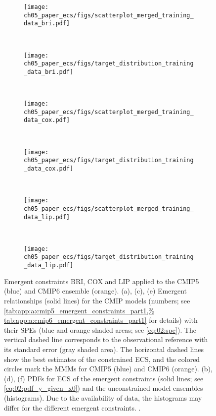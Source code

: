 \begin{figure}[p]
  \centering
  \begin{subfigure}[b]{\SmallSubfigureWidth{}}
    \texttt{[image: 
      ch05\_paper\_ecs/figs/scatterplot\_merged\_training\_data\_bri.pdf]}
    \caption{}
    \label{fig:05:bri_cox_lip:a}
  \end{subfigure}
  ~
  \begin{subfigure}[b]{\SmallSubfigureWidth{}}
    \texttt{[image: 
      ch05\_paper\_ecs/figs/target\_distribution\_training\_data\_bri.pdf]}
    \caption{}
    \label{fig:05:bri_cox_lip:b}
  \end{subfigure}
  \\
  \begin{subfigure}[b]{\SmallSubfigureWidth{}}
    \texttt{[image: 
      ch05\_paper\_ecs/figs/scatterplot\_merged\_training\_data\_cox.pdf]}
    \caption{}
    \label{fig:05:bri_cox_lip:c}
  \end{subfigure}
  ~
  \begin{subfigure}[b]{\SmallSubfigureWidth{}}
    \texttt{[image: 
      ch05\_paper\_ecs/figs/target\_distribution\_training\_data\_cox.pdf]}
    \caption{}
    \label{fig:05:bri_cox_lip:d}
  \end{subfigure}
  \\
  \begin{subfigure}[b]{\SmallSubfigureWidth{}}
    \texttt{[image: 
      ch05\_paper\_ecs/figs/scatterplot\_merged\_training\_data\_lip.pdf]}
    \caption{}
    \label{fig:05:bri_cox_lip:e}
  \end{subfigure}
  ~
  \begin{subfigure}[b]{\SmallSubfigureWidth{}}
    \texttt{[image: 
      ch05\_paper\_ecs/figs/target\_distribution\_training\_data\_lip.pdf]}
    \caption{}
    \label{fig:05:bri_cox_lip:f}
  \end{subfigure}
  \caption{Emergent constraints BRI, COX and LIP applied to the \acs{CMIP}5
    (blue) and \acs{CMIP}6 ensemble (orange). (a), (c), (e) Emergent
    relationships (solid lines) for the \acs{CMIP} models (numbers; see
    \cref{tab:app:a:cmip5_emergent_constraints_part1,%
      tab:app:a:cmip6_emergent_constraints_part1} for details) with their
    \aclp{SPE} (blue and orange shaded areas; see \cref{eq:02:spe}). The
    vertical dashed line corresponds to the observational reference with its
    standard error (gray shaded area). The horizontal dashed lines show the
    best estimates of the constrained \acf{ECS}, and the colored circles mark
    the \aclp{MMM} for \acs{CMIP}5 (blue) and \acs{CMIP}6 (orange). (b), (d),
    (f) \Aclp{PDF} for \acs{ECS} of the emergent constraints (solid lines; see
    \cref{eq:02:pdf_y_given_x0}) and the unconstrained model ensembles
    (histograms). Due to the availability of data, the histograms may differ
    for the different emergent constraints. .}
  \label{fig:05:bri_cox_lip}
\end{figure}


